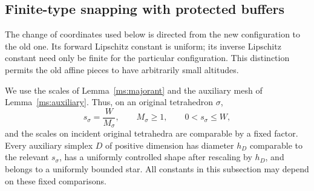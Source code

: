 \subsection{Finite-type snapping with protected buffers}

The change of coordinates used below is directed from the new configuration
to the old one.  Its forward Lipschitz constant is uniform; its inverse
Lipschitz constant need only be finite for the particular configuration.
This distinction permits the old affine pieces to have arbitrarily small
altitudes.



We use the scales of Lemma~\ref{ms:majorant} and the auxiliary mesh of
Lemma~\ref{ms:auxiliary}.  Thus, on an original tetrahedron $\sigma$,
\[
 s_\sigma=\frac{W}{M_\sigma},\qquad M_\sigma\geq 1,
 \qquad 0<s_\sigma\leq W,
\]
and the scales on incident original tetrahedra are comparable by a fixed
factor.  Every auxiliary simplex $D$ of positive dimension has diameter
$h_D$ comparable to the relevant $s_\sigma$, has a uniformly controlled
shape after rescaling by $h_D$, and belongs to a uniformly bounded star.
All constants in this subsection may depend on these fixed comparisons.

